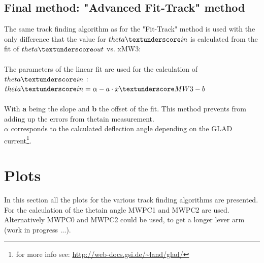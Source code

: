 \documentclass[12pt, letterpaper]{article}
\begin{document}
\subsection{Final method: "Advanced Fit-Track" method}
The same track finding algorithm as for the "Fit-Track" method is used with the only difference that the value for $theta\textunderscore in$ is calculated from the fit of $theta\textunderscore out$ vs. xMW3:\\
\\
The parameters of the linear fit are used for the calculation of $theta\textunderscore in$ :\\

$theta\textunderscore in = \alpha - a \cdot x\textunderscore MW3 - b$ \\
\\
With \textbf{a} being the slope and \textbf{b} the offset of the fit. This method prevents from adding up the errors from theta\textunderscore in measurement.\\
$\alpha$ corresponds to the calculated deflection angle depending on the GLAD current\footnote{for more info see: \url{http://web-docs.gsi.de/~land/glad/}}.

\section{Plots}
In this section all the plots for the various track finding algorithms are presented. For the calculation of the theta\textunderscore in angle MWPC1 and MWPC2 are used. Alternatively MWPC0 and MWPC2 could be used, to get a longer lever arm (work in progress ...).\\
\end{document}
